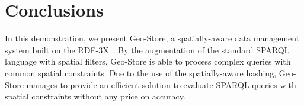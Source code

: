 \section{Conclusions}
In this demonstration, we present Geo-Store, a spatially-aware data management system built on the RDF-3X~\cite{DBLP:journals/vldb/NeumannW10}. By the augmentation of the standard SPARQL language with spatial filters, Geo-Store is able to process complex queries with common spatial constraints. Due to the use of the spatially-aware hashing, Geo-Store manages to provide an efficient solution to evaluate SPARQL queries with spatial constraints without any price on accuracy.

